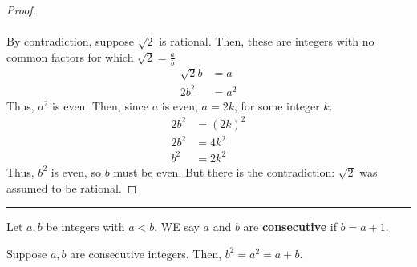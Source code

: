 \documentclass{article}
\def \proofDistance {5pt}
\newcommand{\proofseparator}{\par\noindent\rule{\textwidth}{0.4pt}}
\begin{document}
            \vspace{\proofDistance}
        
            \begin{proof}
                \mbox{}\\[-\baselineskip] \\
                By contradiction, suppose $\sqrt{2}$ is rational. Then, these are integers with no common factors for which $\sqrt{2} = \frac{a}{b}$
                \begin{align*}
                    \sqrt{2}b &= a \\
                    2b^2 &= a^2 
                \end{align*}
                Thus, $a^2$ is even. Then, since $a$ is even, $a = 2k$, for some integer $k$.
                \begin{align*}
                    2b^2 &= (2k)^2 \\
                    2b^2 &= 4k^2 \\
                    b^2 &= 2k^2 
                \end{align*}
                Thus, $b^2$ is even, so $b$ must be even. But there is the contradiction: $\sqrt{2}$ was assumed to be rational.
            \end{proof}
        
            \proofseparator

\newpage


            \begin{definition}
                Let $a,b$ be integers with $a < b$. WE say $a$ and $b$ are \textbf{consecutive} if $b = a + 1$.
            \end{definition}

            \vspace{\proofDistance}
        
            \begin{theorem}
                Suppose $a,b$ are consecutive integers. Then, $b^2 = a^2 = a + b$.
            \end{theorem}
        
            \vspace{\proofDistance}
        
\end{document}
